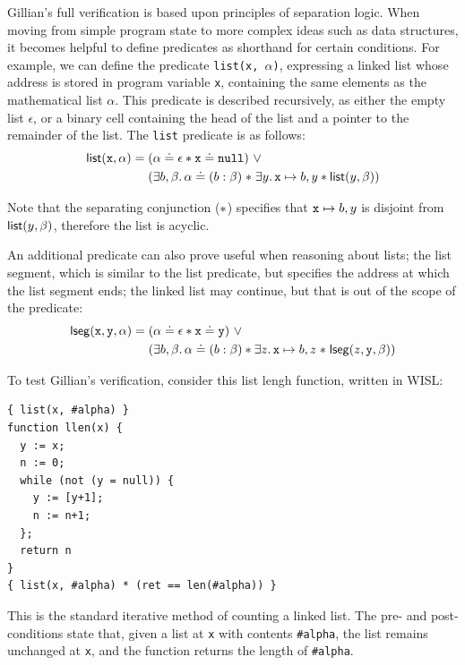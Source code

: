 Gillian's full verification is based upon principles of separation logic. When
moving from simple program state to more complex ideas such as data structures,
it becomes helpful to define predicates as shorthand for certain conditions.
For example, we can define the predicate \texttt{list(x, $\alpha$)}, expressing
a linked list whose address is stored in program variable \texttt{x},
containing the same elements as the mathematical list $\alpha$. This predicate
is described recursively, as either the empty list $\epsilon$, or a binary cell
containing the head of the list and a pointer to the remainder of the list. The
\texttt{list} predicate is as follows:
\begin{align*}
  \mathsf{list}(\mathtt{x}, \alpha) =\; &(\alpha \doteq \epsilon \ast \mathtt{x} \doteq \mathtt{null})~\lor\\
  & (\exists b, \beta \ldotp \alpha \doteq (b : \beta) \mathrel{*} \exists y \ldotp \mathtt{x} \mapsto b, y \ast \mathsf{list}(y, \beta))
\end{align*}

Note that the separating conjunction ($\mathrel{*}$) specifies that
$\mathtt{x} \mapsto b, y$ is disjoint from $\mathsf{list}(y, \beta)$, therefore the
list is acyclic.

An additional predicate can also prove useful when reasoning about lists; the
list segment, which is similar to the list predicate, but specifies the address
at which the list segment ends; the linked list may continue, but that is out
of the scope of the predicate:
\begin{align*}
  \mathsf{lseg}(\mathtt{x}, \mathtt{y}, \alpha) =\; &(\alpha \doteq \epsilon \ast \mathtt{x} \doteq \mathtt{y})~\lor\\
  &(\exists b, \beta \ldotp \alpha \doteq (b : \beta) \ast \exists z \ldotp \mathtt{x} \mapsto b, z \mathrel{*} \mathsf{lseg}(z, \mathtt{y}, \beta))
\end{align*}

To test Gillian's verification, consider this list lengh function, written in WISL:

\begin{lstlisting}[numbers=none, caption={Verification example - list length in WISL}, style=code]
{ list(x, #alpha) }
function llen(x) {
  y := x;
  n := 0;
  while (not (y = null)) {
    y := [y+1];
    n := n+1;
  };
  return n
}
{ list(x, #alpha) * (ret == len(#alpha)) }
\end{lstlisting}

This is the standard iterative method of counting a linked list. The pre- and post-conditions state that, given a list at \texttt{x} with contents \texttt{\#alpha}, the list remains unchanged at \texttt{x}, and the function returns the length of \texttt{\#alpha}.

